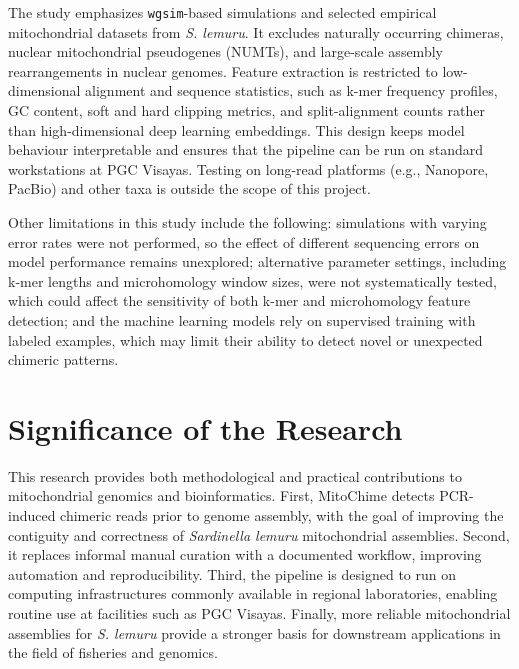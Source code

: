 The study emphasizes \texttt{wgsim}-based simulations and selected empirical mitochondrial datasets from \textit{S. lemuru}. It excludes naturally occurring chimeras, nuclear mitochondrial pseudogenes (NUMTs), and large-scale assembly rearrangements in nuclear genomes. Feature extraction is restricted to low-dimensional alignment and sequence statistics, such as k-mer frequency profiles, GC content, soft and hard clipping metrics, and split-alignment counts rather than high-dimensional deep learning embeddings. This design keeps model behaviour interpretable and ensures that the pipeline can be run on standard workstations at PGC Visayas. Testing on long-read platforms (e.g., Nanopore, PacBio) and other taxa is outside the scope of this project.

Other limitations in this study include the following: simulations with varying error rates were not performed, so the effect of different sequencing errors on model performance remains unexplored; alternative parameter settings, including k-mer lengths and microhomology window sizes, were not systematically tested, which could affect the sensitivity of both k-mer and microhomology feature detection; and the machine learning models rely on supervised training with labeled examples, which may limit their ability to detect novel or unexpected chimeric patterns.

\section{Significance of the Research}\label{sec:significance}

This research provides both methodological and practical contributions to mitochondrial genomics and bioinformatics. First, MitoChime detects PCR-induced chimeric reads prior to genome assembly, with the goal of improving the contiguity and correctness of \textit{Sardinella lemuru} mitochondrial assemblies. Second, it replaces informal manual curation with a documented workflow, improving automation and reproducibility. Third, the pipeline is designed to run on computing infrastructures commonly available in regional laboratories, enabling routine use at facilities such as PGC Visayas. Finally, more reliable mitochondrial assemblies for \textit{S. lemuru} provide a stronger basis for downstream applications in the field of fisheries and genomics.